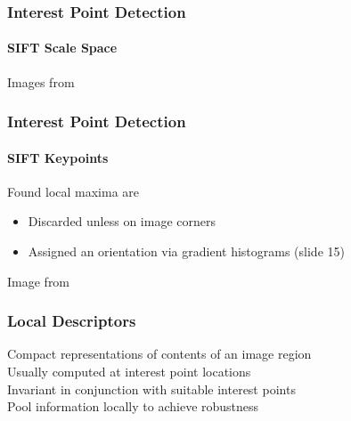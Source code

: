 \documentclass[xetex,professionalfont]{beamer}
\begin{document}

\begin{frame}
\frametitle{Interest Point Detection}
\framesubtitle{SIFT Scale Space}

\begin{center}
    {\centering Images from \cite{prince12}}
\end{center}

\end{frame}


\begin{frame}
\frametitle{Interest Point Detection}
\framesubtitle{SIFT Keypoints}

Found local maxima are
\begin{itemize}
    \item Discarded unless on image corners
    \item Assigned an orientation via gradient histograms (slide 15) %
\end{itemize}

\bigskip
\begin{center}
    {\centering Image from \cite{prince12}}
\end{center}

\end{frame}


\begin{frame}
\frametitle{Local Descriptors}

Compact representations of contents of an image region\\\medskip
Usually computed at interest point locations\\\medskip %
Invariant in conjunction with suitable interest points\\\medskip %
Pool information locally to achieve robustness %

\end{frame}
\end{document}
